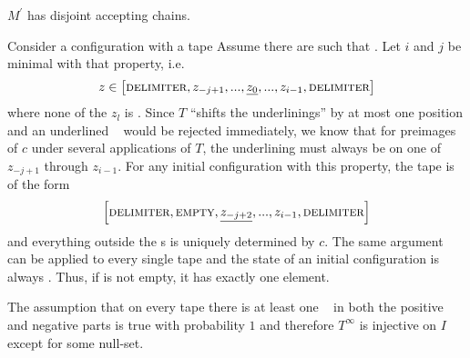 \begin{Lemma}
	$M^\prime$ has disjoint accepting chains.
\end{Lemma}
\proof
Consider a configuration  with a tape 
Assume there are  such that .
Let $i$ and $j$ be minimal with that property, i.e.
\begin{align*}
	z \in \left [ \text{\scshape{delimiter}} , z_{-j+1} , ... , \underline{z_0} , ... , z_{i-1} , \text{\scshape{delimiter}} \right ]
\end{align*}
where none of the $z_l$ is \DELIM.
Since $T$ ``shifts the underlinings'' by at most one position and an underlined \DELIM~ would be rejected immediately, we know that for preimages of $c$ under several applications of $T$, the underlining must always be on one of $z_{-j+1}$ through $z_{i-1}$. For any initial configuration with this property, the tape is of the form
\begin{align*}
	\left [ \text{\scshape{delimiter}} , \text{\scshape{empty}} , \underline{z_{-j+2}} , ... , z_{i-1} , \text{\scshape{delimiter}} \right ]
\end{align*}
and everything outside the \DELIM s is uniquely determined by $c$.
The same argument can be applied to every single tape and the state of an initial configuration is always \INI.
Thus, if  is not empty, it has exactly one element.

The assumption that on every tape there is at least one \DELIM~ in both the positive and negative parts is true with probability $1$ and therefore $T^\infty$ is injective on $I$ except for some null-set.
\endproof
